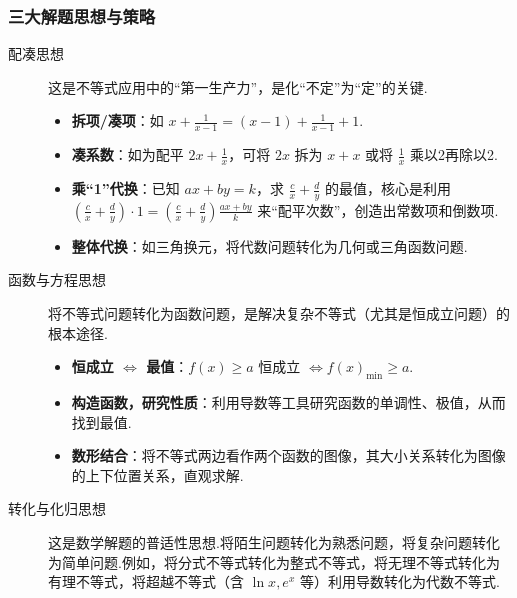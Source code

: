 \subsubsection*{三大解题思想与策略}
\begin{description}
	\item[配凑思想] 这是不等式应用中的“第一生产力”，是化“不定”为“定”的关键.
	\begin{itemize}
		\item \textbf{拆项/凑项}：如 $x+\frac{1}{x-1} = (x-1)+\frac{1}{x-1}+1$.
		\item \textbf{凑系数}：如为配平 $2x+\frac{1}{x}$，可将 $2x$ 拆为 $x+x$ 或将 $\frac{1}{x}$ 乘以2再除以2.
		\item \textbf{乘“1”代换}：已知 $ax+by=k$，求 $\frac{c}{x}+\frac{d}{y}$ 的最值，核心是利用 $(\frac{c}{x}+\frac{d}{y}) \cdot 1 = (\frac{c}{x}+\frac{d}{y}) \frac{ax+by}{k}$ 来“配平次数”，创造出常数项和倒数项.
		\item \textbf{整体代换}：如三角换元，将代数问题转化为几何或三角函数问题.
	\end{itemize}
	\item[函数与方程思想] 将不等式问题转化为函数问题，是解决复杂不等式（尤其是恒成立问题）的根本途径.
	\begin{itemize}
		\item \textbf{恒成立 $\iff$ 最值}：$f(x) \ge a$ 恒成立 $\iff f(x)_{\min} \ge a$.
		\item \textbf{构造函数，研究性质}：利用导数等工具研究函数的单调性、极值，从而找到最值.
		\item \textbf{数形结合}：将不等式两边看作两个函数的图像，其大小关系转化为图像的上下位置关系，直观求解.
	\end{itemize}
	\item[转化与化归思想] 这是数学解题的普适性思想.将陌生问题转化为熟悉问题，将复杂问题转化为简单问题.例如，将分式不等式转化为整式不等式，将无理不等式转化为有理不等式，将超越不等式（含 $\ln x, e^x$ 等）利用导数转化为代数不等式.
\end{description}